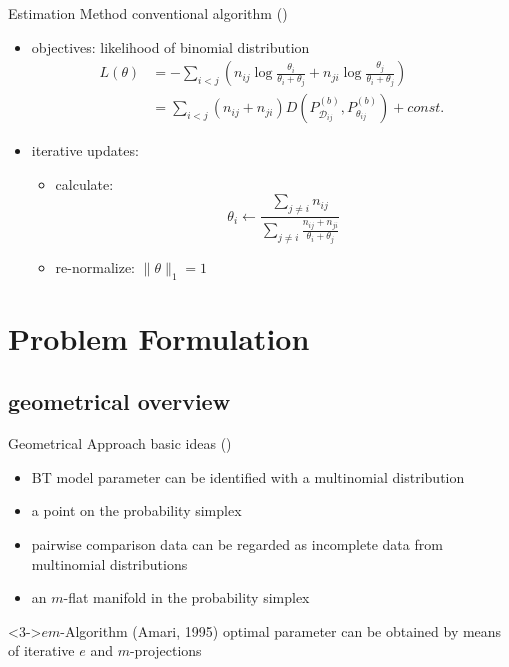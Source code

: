 \documentclass[fleqn,aspectratio=1610]{beamer}
\begin{document}
\begin{frame}[label={sec:orgdc2c086}]{Estimation Method}
conventional algorithm
(\cite{HastieTibshirani1998})
\begin{itemize}
\item objectives: likelihood of binomial distribution
\begin{align}
  L(\theta)
  &=-\sum_{i<j}\left(
    n_{ij}\log\frac{\theta_{i}}{\theta_{i}+\theta_{j}}+
    n_{ji}\log\frac{\theta_{j}}{\theta_{i}+\theta_{j}}
    \right)\\
  &=\sum_{i<j}(n_{ij}+n_{ji})
    D(P^{(b)}_{\mathcal{D}_{ij}},P^{(b)}_{\theta_{ij}})
    +const.
\end{align}
\item iterative updates:
\begin{itemize}
\item calculate:
\begin{equation}
  \theta_{i}
  \leftarrow\frac{\sum_{j\not=i}n_{ij}}
  {\sum_{j\not=i}\frac{n_{ij}+n_{ji}}{\theta_{i}+\theta_{j}}}
\end{equation}
\item re-normalize: \(\|\theta\|_{1}=1\)
\end{itemize}
\end{itemize}
\end{frame}


\section{Problem Formulation}
\label{sec:orgba9c6b4}
\subsection{geometrical overview}
\label{sec:org1505070}
\begin{frame}[label={sec:org3ca74f7}]{Geometrical Approach}
basic ideas (\cite{FujimotoHinoMurata2011})
\begin{itemize}
\item BT model parameter can be identified with a multinomial distribution
\item <2-| alert@2>[] a point on the probability simplex
\item pairwise comparison data can be regarded as 
incomplete data from multinomial distributions
\item <2-| alert@2>[] an \(m\)-flat manifold in the probability simplex
\end{itemize}
\begin{alertblock}<3->{\(em\)-Algorithm (Amari, 1995)}
optimal parameter can be obtained by means of
iterative \(e\) and \(m\)-projections
\end{alertblock}
\end{frame}
\end{document}
